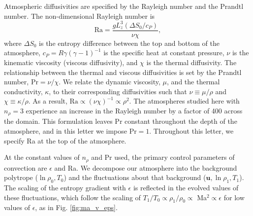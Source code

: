 \documentclass[aps, prl, twocolumn, nofootinbib, groupedaddress, amsfonts, amssymb, amsmath]{revtex4-1}
\begin{document}
Atmospheric diffusivities are specified by the Rayleigh number and the Prandtl number.  The
non-dimensional Rayleigh number is
\begin{equation}
\text{Ra} = \frac{g L_z^3 (\Delta S_0 / c_P)}{\nu\chi},
\end{equation}
where $\Delta S_0$ is the entropy difference between the top and bottom of the atmosphere, 
$c_P = R\gamma(\gamma-1)^{-1}$ is the specific heat at constant pressure,
$\nu$ is the kinematic viscosity (viscous diffusivity), and $\chi$ is the thermal diffusivity.  
The relationship between the thermal and viscous diffusivities is
set by the Prandtl number, Pr$ = \nu/\chi$.   We relate the dynamic viscosity, $\mu$, and the thermal conductivity,
$\kappa$, to their corresponding diffusivities such that 
$\nu \equiv \mu/\rho$ and $\chi \equiv \kappa/\rho$.  As a result, $\text{Ra} \propto (\nu\chi)^{-1} \propto
\rho^2$.  The atmospheres studied here with $n_{\rho} = 3$ experience an increase in the Rayleigh number 
by a factor of 400 across the domain.  This formulation leaves Pr
constant throughout the depth of the atmosphere, and in this letter we impose $\text{Pr} = 1$.
Throughout this letter, we specify Ra at the top of the atmosphere.

At the constant values of $n_\rho$ and Pr used, the primary control parameters of convection are $\epsilon$
and Ra.  We decompose our atmosphere into the background polytrope ($\ln\rho_{0}, T_{0}$) and the fluctuations
about that background ($\bm{u}, \ln\rho_{1}, T_{1}$).  The scaling of the entropy gradient with $\epsilon$
is reflected in the evolved values of these fluctuations, which follow the scaling of
$T_1/T_0 \propto \rho_{1}/\rho_{0} \propto$ Ma$^{2} \propto \epsilon$ for low values of $\epsilon$,
as in Fig. \ref{fig:ma_v_eps}.
\end{document}
